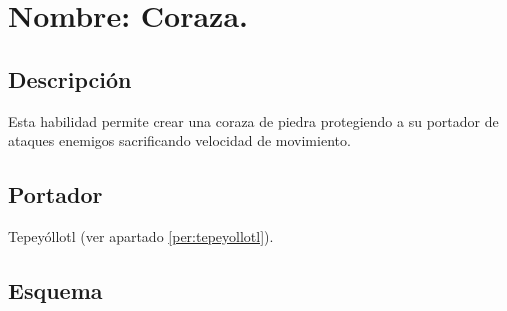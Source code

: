 \section{Nombre: Coraza.}\label{hab.coraza}
\subsection{Descripción}
Esta habilidad permite crear una coraza de piedra protegiendo a su portador de ataques enemigos sacrificando velocidad de movimiento.  
\subsection{Portador}
Tepeyóllotl (ver apartado \ref{per:tepeyollotl}).
\subsection{Esquema}
		